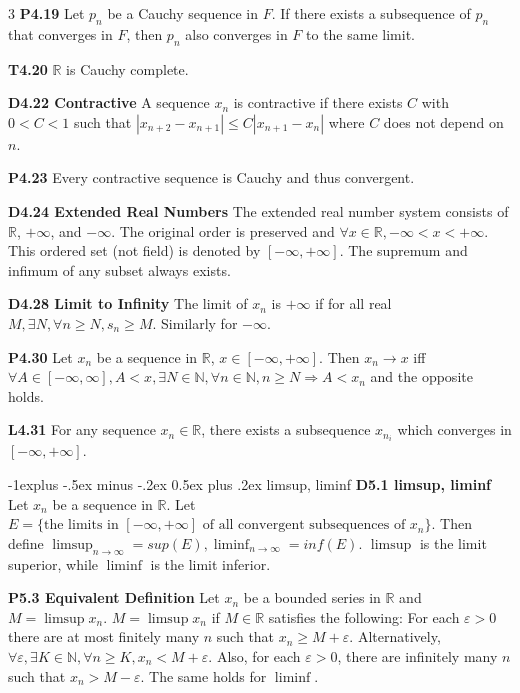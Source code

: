 \documentclass[10pt, landscape]{article}
\makeatletter
\renewcommand{\section}{\@startsection{section}{1}{0mm}%
                                {-1ex plus -.5ex minus -.2ex}%
                                {0.5ex plus .2ex}%
                                {\normalfont\large\bfseries}}
\renewcommand{\section}{\@startsection{section}{2}{0mm}%
                                {-1explus -.5ex minus -.2ex}%
                                {0.5ex plus .2ex}%
                                {\normalfont\normalsize\bfseries}}
\makeatother
\begin{document}
\begin{multicols*}{3}
\textbf{P4.19} Let $p_n$ be a Cauchy sequence in $F$. If there exists a subsequence of $p_n$ that converges in $F$, then $p_n$ also converges in $F$ to the same limit.

\textbf{T4.20} $\mathbb{R}$ is Cauchy complete.

\textbf{D4.22 Contractive} A sequence $x_n$ is contractive if there exists $C$ with $0<C<1$ such that $|x_{n+2}-x_{n+1}|\leq C|x_{n+1}-x_n|$ where $C$ does not depend on $n$.

\textbf{P4.23} Every contractive sequence is Cauchy and thus convergent.

\textbf{D4.24 Extended Real Numbers} The extended real number system consists of $\mathbb{R}$, $+\infty$, and $-\infty$. The original order is preserved and $\forall x \in \mathbb{R}, -\infty < x < +\infty$. This ordered set (not field) is denoted by $[-\infty, +\infty]$. The supremum and infimum of any subset always exists.

\textbf{D4.28 Limit to Infinity} The limit of $x_n$ is $+\infty$ if for all real $M, \exists N, \forall n \geq N, s_n \geq M$. Similarly for $-\infty$.

\textbf{P4.30} Let $x_n$ be a sequence in $\mathbb{R}$, $x \in [-\infty, +\infty]$. Then $x_n \rightarrow x $ iff $\forall A \in [-\infty, \infty], A < x, \exists N \in \mathbb{N}, \forall n \in \mathbb{N}, n \geq N \Rightarrow A<x_n$ and the opposite holds.

\textbf{L4.31} For any sequence $x_n\in\mathbb{R}$, there exists a subsequence $x_{n_i}$ which converges in $[-\infty, +\infty]$.

\section{limsup, liminf}
\textbf{D5.1 limsup, liminf} Let $x_n$ be a sequence in $\mathbb{R}$. Let $E=\{\text{the limits in $[-\infty, +\infty]$ of all convergent subsequences of $x_n$}\}$. Then define $\limsup_{n \rightarrow \infty}=sup(E), \liminf_{n\rightarrow\infty}=inf(E)$. $\limsup$ is the limit superior, while $\liminf$ is the limit inferior.

\textbf{P5.3 Equivalent Definition} Let $x_n$ be a bounded series in $\mathbb{R}$ and $M=\limsup x_n$. $M=\limsup x_n$ if $M\in\mathbb{R}$ satisfies the following: For each $\varepsilon>0$ there are at most finitely many $n$ such that $x_n \geq M + \varepsilon$. Alternatively, $\forall\varepsilon, \exists K\in\mathbb{N}, \forall n \geq K, x_n < M + \varepsilon$. Also, for each $\varepsilon>0$, there are infinitely many $n$ such that $x_n > M-\varepsilon$. The same holds for $\liminf$.


\end{multicols*}
\end{document}
